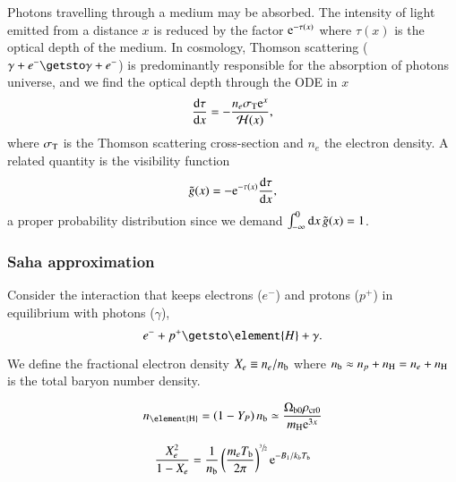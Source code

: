 
Photons travelling through a medium may be absorbed. The intensity of light emitted from a distance $x$ is reduced by the factor $\mathrm{e}^{-\tau(x)}$ where $\tau(x)$ is the optical depth of the medium. In cosmology, Thomson scattering ($\gamma + e^{-} \getsto \gamma+ e^{-}$) is predominantly responsible for the absorption of photons universe, and we find the optical depth through the ODE in $x$
\begin{equation}\label{mil2:theo:eq:ode_tau_of_x}
    \dv{\tau}{x} = - \frac{n_e \sigma_\mathrm{T}\mathrm{e}^{x}}{\mathcal{H}(x)},
\end{equation}
where $\sigma_\mathrm{T}$ is the Thomson scattering cross-section and $n_e$ the electron density. A related quantity is the visibility function
\begin{equation}\label{mil2:theo:eq:gt_of_x}
    \tilde{g}(x)= - \mathrm{e}^{-\tau(x)} \dv{\tau}{x},
\end{equation}
a proper probability distribution since we demand $\int_{-\infty}^{0}\mathrm{d} x\, \tilde{g}(x) = 1$. 

\subsubsection{Saha approximation}\label{mil2:theo:sec:Saha}
    Consider the interaction that keeps electrons ($e^{-}$) and protons ($p^{+}$) in equilibrium with photons ($\gamma$),
    \begin{equation}\label{mil2:theo:eq:relevant_interaction}
        e^{-} + p^{+} \getsto \element{H}+\gamma.
    \end{equation}
    
    We define the fractional electron density $X_e\equiv n_e/n_\mathrm{b}$ where $n_\mathrm{b} \approx n_p + n_\mathrm{H} = n_e +n_\mathrm{H}$ is the total baryon number density. 

    \begin{equation}
        n\ped{\element{H}} = \left(1-Y_P\right) n\ped{b} \simeq \frac{\Omega\ped{b0}\rho\ped{cr0}}{m\ped{H}\eu^{3x}}
    \end{equation}

    \begin{equation}\label{mil2:theo:eq:Saha}
        \frac{X_e^2}{1-X_e}= \frac{1}{n_\mathrm{b}}\left(\frac{m_e T_\mathrm{b}}{2\pi} \right)^{\sfrac{3}{2}} \mathrm{e}^{-B_1/k_b T_\mathrm{b}}
    \end{equation}


